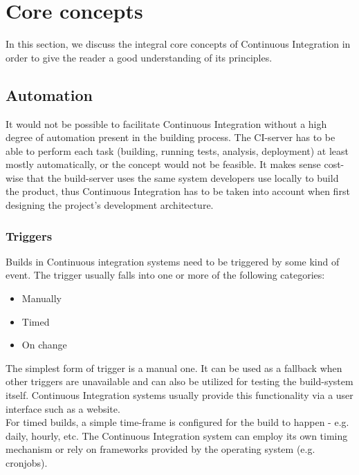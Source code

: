 \section{Core concepts}\label{sec:core-concepts}

In this section, we discuss the integral core concepts of Continuous Integration
in order to give the reader a good understanding of its principles.

\subsection{Automation}\label{sec:automation}

It would not be possible to facilitate Continuous Integration without a high
degree of automation present in the building process. The CI-server has to be
able to perform each task (building, running tests, analysis, deployment) at
least mostly automatically, or the concept would not be feasible. It makes sense
cost-wise that the build-server uses the same system developers use locally to
build the product, thus Continuous Integration has to be taken into account when
first designing the project's development architecture.\\

\subsubsection{Triggers}\label{sec:triggers}

Builds in Continuous integration systems need to be triggered by some kind of
event. The trigger usually falls into one or more of the following categories:

\begin{itemize}
    \item Manually
    \item Timed
    \item On change
\end{itemize}

The simplest form of trigger is a manual one. It can be used as a fallback when
other triggers are unavailable and can also be utilized for testing the
build-system itself. Continuous Integration systems usually provide this
functionality via a user interface such as a website.\\

For timed builds, a simple time-frame is configured for the build to happen -
e.g. daily, hourly, etc. The Continuous Integration system can employ its own
timing mechanism or rely on frameworks provided by the operating system (e.g.
cronjobs).\\

